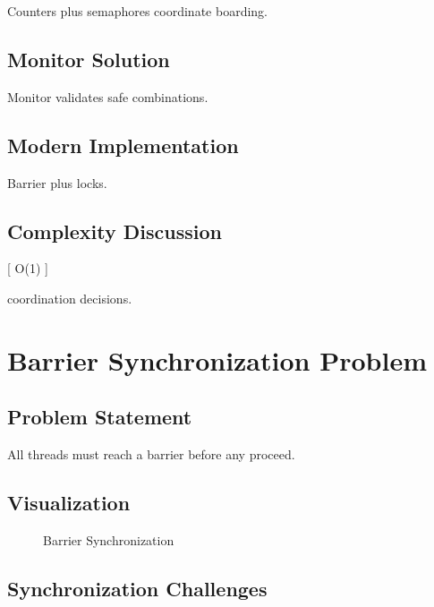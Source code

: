 Counters plus semaphores coordinate boarding.

\subsection{Monitor Solution}

Monitor validates safe combinations.

\subsection{Modern Implementation}

Barrier plus locks.

\subsection{Complexity Discussion}

[
O(1)
]

coordination decisions.

\section{Barrier Synchronization Problem}

\subsection{Problem Statement}

All threads must reach a barrier before any proceed.

\subsection{Visualization}

\begin{figure}[H]
\centering
{}
\caption{Barrier Synchronization}
\end{figure}

\subsection{Synchronization Challenges}

